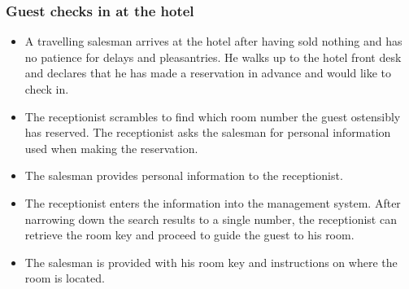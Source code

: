 \subsubsection{Guest checks in at the hotel}\label{scenario2}
% 
% 
% 
\begin{itemize}
  \item A travelling salesman arrives at the hotel after having sold nothing and has no patience for delays and pleasantries.
    He walks up to the hotel front desk and declares that he has made a reservation in advance and would like to check  in.
    
  \item The receptionist scrambles to find which room number the guest
    ostensibly has reserved. The receptionist asks the salesman for personal information used when making the reservation.

  \item The salesman provides personal information to the receptionist.
      
  \item The receptionist enters the information into the management system.
    After narrowing down the search results to a single number, the
    receptionist can retrieve the room key and proceed to guide the guest
    to his room.

  \item The salesman is provided with his room key and instructions on where
      the room is located.
\end{itemize}


